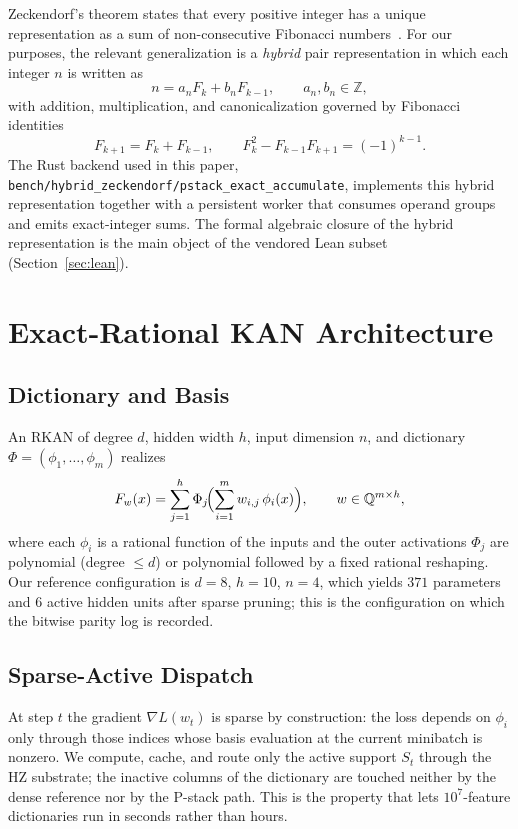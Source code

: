\documentclass[11pt,a4paper]{article}
\begin{document}
Zeckendorf's theorem states that every positive integer has a unique
representation as a sum of non-consecutive Fibonacci
numbers~\cite{zeckendorf1972}. For our purposes, the relevant
generalization is a \emph{hybrid} pair representation in which each integer
$n$ is written as
\begin{equation}
n = a_{n} F_{k} + b_{n} F_{k-1}, \qquad a_{n}, b_{n} \in \mathbb{Z},
\label{eq:hybrid}
\end{equation}
with addition, multiplication, and canonicalization governed by Fibonacci
identities
\[
F_{k+1} = F_{k} + F_{k-1}, \qquad F_{k}^{2} - F_{k-1} F_{k+1} = (-1)^{k-1}.
\]
The Rust backend used in this paper,
\texttt{bench/hybrid\_zeckendorf/pstack\_exact\_accumulate}, implements
this hybrid representation together with a persistent worker that
consumes operand groups and emits exact-integer sums. The formal
algebraic closure of the hybrid representation is the main object of the
vendored Lean subset (Section~\ref{sec:lean}).

\section{Exact-Rational KAN Architecture}
\label{sec:rkan}

\subsection{Dictionary and Basis}

An RKAN of degree $d$, hidden width $h$, input dimension $n$, and
dictionary $\Phi = (\phi_{1},\ldots,\phi_{m})$ realizes
\begin{equation}
F_{w}(x) = \sum_{j=1}^{h} \Phi_{j}\!\Bigl(\sum_{i=1}^{m} w_{i,j}\, \phi_{i}(x)\Bigr),
\qquad w \in \mathbb{Q}^{m \times h},
\label{eq:rkan}
\end{equation}
where each $\phi_{i}$ is a rational function of the inputs and the outer
activations $\Phi_{j}$ are polynomial (degree $\leq d$) or polynomial
followed by a fixed rational reshaping. Our reference configuration is
$d = 8$, $h = 10$, $n = 4$, which yields $371$ parameters and $6$
active hidden units after sparse pruning; this is the configuration on
which the bitwise parity log is recorded.

\subsection{Sparse-Active Dispatch}

At step $t$ the gradient $\nabla L(w_{t})$ is sparse by construction: the
loss depends on $\phi_{i}$ only through those indices whose basis
evaluation at the current minibatch is nonzero. We compute, cache, and
route only the active support $S_{t}$ through the HZ substrate; the
inactive columns of the dictionary are touched neither by the dense
reference nor by the P-stack path. This is the property that lets
$10^{7}$-feature dictionaries run in seconds rather than hours.
\end{document}

